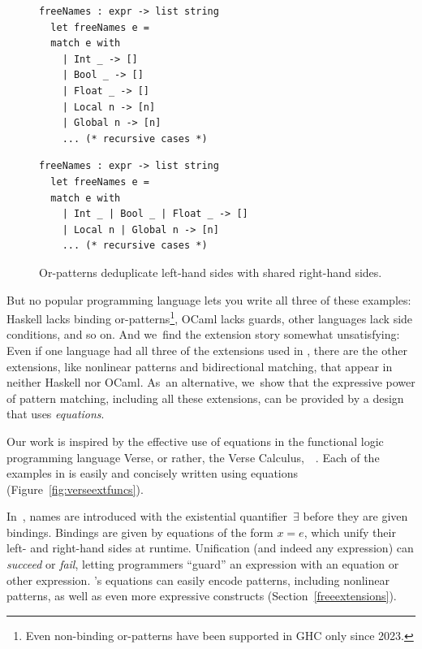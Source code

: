 \documentclass[runningheads]{llncs}
\begin{document}
\begin{figure}[t]
\centering
\begin{minipage}{0.45\linewidth}
\scriptsize
\begin{verbatim}
freeNames : expr -> list string 
  let freeNames e =
  match e with
    | Int _ -> []
    | Bool _ -> []
    | Float _ -> []
    | Local n -> [n]
    | Global n -> [n]
    ... (* recursive cases *)
\end{verbatim}
\caption*{OCaml, without using or-patterns}
\end{minipage}
\begin{minipage}{0.45\linewidth}
\scriptsize
\begin{verbatim}
freeNames : expr -> list string 
  let freeNames e =
  match e with
    | Int _ | Bool _ | Float _ -> []
    | Local n | Global n -> [n]
    ... (* recursive cases *)
\end{verbatim}
\caption*{OCaml using or-patterns}
\end{minipage}
\caption{Or-patterns deduplicate left-hand sides with shared right-hand sides.}
\label{fig:pmorpats}
\end{figure}


But no popular programming language lets you write all three of these
examples:
Haskell lacks
binding or-patterns\footnote{Even non-binding or-patterns have been
supported in GHC only
since 2023.}, OCaml lacks guards, other languages lack side conditions, and so
on. %
And we~find the extension story somewhat unsatisfying: Even if one language had
all three of the extensions used in
, there are the other extensions,
like nonlinear patterns and bidirectional matching,  that appear in neither
Haskell nor OCaml. %
As~an alternative, we~show that the expressive power of 
pattern matching, including all these extensions,
can be provided by a design that uses \emph{equations}. %

Our work is inspired by the effective use of equations in
the functional logic programming language Verse,
or rather, the Verse Calculus,~\VC~\cite{verse}. %
Each of the examples in  is easily
and concisely written using equations (Figure~\ref{fig:verseextfuncs}).

In~\VC, names are introduced with the existential quantifier~{$\exists$} before they are
given bindings. %
Bindings are given by equations of the form $x = e$, which unify their left- and
right-hand sides at runtime. %
Unification (and indeed any \VC expression) can \textit{succeed} or
\textit{fail}, letting programmers ``guard'' an expression with an equation or other
expression. 
\VC's equations can easily encode patterns, including nonlinear patterns,
as well as 
even more expressive constructs (Section~\ref{freeextensions}). %
\end{document}
